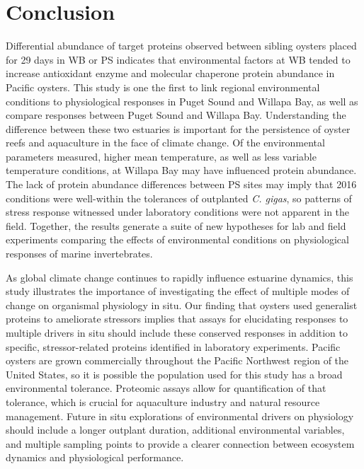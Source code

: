 \documentclass [11pt, proquest] {uwthesis}[2015/03/03]
\begin{document}
\hypertarget{conclusion}{%
\section{Conclusion}\label{conclusion}}

Differential abundance of target proteins observed between sibling oysters placed for 29 days in WB or PS indicates that environmental factors at WB tended to increase antioxidant enzyme and molecular chaperone protein abundance in Pacific oysters. This study is one the first to link regional environmental conditions to physiological responses in Puget Sound and Willapa Bay, as well as compare responses between Puget Sound and Willapa Bay. Understanding the difference between these two estuaries is important for the persistence of oyster reefs and aquaculture in the face of climate change. Of the environmental parameters measured, higher mean temperature, as well as less variable temperature conditions, at Willapa Bay may have influenced protein abundance. The lack of protein abundance differences between PS sites may imply that 2016 conditions were well-within the tolerances of outplanted \emph{C. gigas}, so patterns of stress response witnessed under laboratory conditions were not apparent in the field. Together, the results generate a suite of new hypotheses for lab and field experiments comparing the effects of environmental conditions on physiological responses of marine invertebrates.

As global climate change continues to rapidly influence estuarine dynamics, this study illustrates the importance of investigating the effect of multiple modes of change on organismal physiology in situ. Our finding that oysters used generalist proteins to ameliorate stressors implies that assays for elucidating responses to multiple drivers in situ should include these conserved responses in addition to specific, stressor-related proteins identified in laboratory experiments. Pacific oysters are grown commercially throughout the Pacific Northwest region of the United States, so it is possible the population used for this study has a broad environmental tolerance. Proteomic assays allow for quantification of that tolerance, which is crucial for aquaculture industry and natural resource management. Future in situ explorations of environmental drivers on physiology should include a longer outplant duration, additional environmental variables, and multiple sampling points to provide a clearer connection between ecosystem dynamics and physiological performance.
\end{document}
